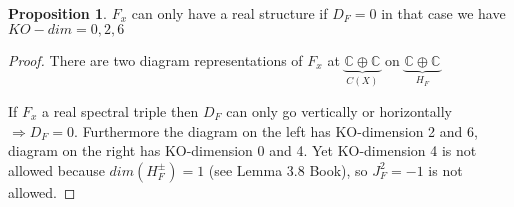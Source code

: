 \documentclass[a4paper]{article}
\theoremstyle{definition}
\theoremstyle{definition}
\theoremstyle{definition}
\theoremstyle{theorem}
\theoremstyle{theorem}
\theoremstyle{theorem}
\newtheorem{proposition}{Proposition}
\begin{document}
    \begin{proposition}
        $F_x$ can only have a real structure if $D_F = 0$ in that case we
        have
        $KO-dim = 0, 2, 6$
    \end{proposition}
    \begin{proof}
        There are two diagram representations of $F_x$ at
        $\underbrace{\mathbb{C} \oplus \mathbb{C}}_{C(X)}$
        on $\underbrace{\mathbb{C} \oplus\mathbb{C}}_{H_F}$

        \begin{figure}[h!] \centering
        \end{figure}
    If $F_x$ a real spectral triple then $D_F$ can only go vertically or
    horizontally $\Rightarrow D_F = 0$.  Furthermore the diagram on the
    left has KO-dimension 2 and 6, diagram on the right has KO-dimension
    0 and 4. Yet KO-dimension 4 is not allowed because
    $dim(H_F^\pm) = 1$ (see Lemma 3.8 Book), so $J_F^2 = -1$ is not
    allowed.
    \end{proof}
\end{document}
